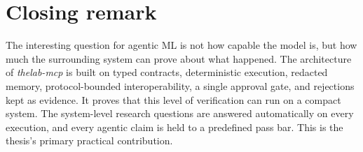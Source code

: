 \section{Closing remark}

The interesting question for agentic ML is not how capable the model is, but how much the surrounding system can prove about what happened. The architecture of \emph{thelab-mcp} is built on typed contracts, deterministic execution, redacted memory, protocol-bounded interoperability, a single approval gate, and rejections kept as evidence. It proves that this level of verification can run on a compact system. The system-level research questions are answered automatically on every execution, and every agentic claim is held to a predefined pass bar. This is the thesis's primary practical contribution.
